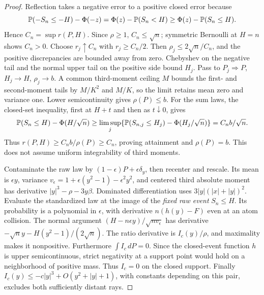 \begin{proof}
Reflection takes a negative error to a positive closed error because
\[
 \mathbb P(-S_n\le-H)-\Phi(-z)
 =\Phi(z)-\mathbb P(S_n<H)\ge\Phi(z)-\mathbb P(S_n\le H).
\]
Hence $C_n=\sup r(P,H)$. Since $\rho\ge1$, $C_n\le\sqrt n$;
symmetric Bernoulli at $H=n$ shows $C_n>0$.
Choose $r_j\uparrow C_n$ with $r_j\ge C_n/2$. Then
$\rho_j\le2\sqrt n/C_n$, and the positive discrepancies are bounded
away from zero. Chebyshev on the negative tail and the normal upper
tail on the positive side bound $H_j$. Pass to $P_j\Rightarrow P$,
$H_j\to H$, $\rho_j\to b$. A common third-moment ceiling $M$ bounds
the first- and second-moment tails by $M/K^2$ and $M/K$, so the limit
retains mean zero and variance one. Lower semicontinuity gives
$\rho(P)\le b$. For the sum laws, the closed-set inequality, first at
$H+t$ and then as $t\downarrow0$, gives
\[
 \mathbb P(S_n\le H)-\Phi(H/\sqrt n)
 \ge\limsup_j\{\mathbb P(S_{n,j}\le H_j)-\Phi(H_j/\sqrt n)\}
 =C_n b/\sqrt n.
\]
Thus $r(P,H)\ge C_n b/\rho(P)\ge C_n$, proving attainment and
$\rho(P)=b$. This does not assume uniform integrability of third moments.

Contaminate the raw law by $(1-\epsilon)P+\epsilon\delta_y$, then
recenter and rescale. Its mean is $\epsilon y$, variance
$v_\epsilon=1+\epsilon(y^2-1)-\epsilon^2y^2$, and centered third
absolute moment has derivative $|y|^3-\rho-3y\beta$.
Dominated differentiation uses $3|y|(|x|+|y|)^2$.
Evaluate the standardized law at the image of the \emph{fixed raw event}
$S_n\le H$. Its probability is a polynomial in $\epsilon$, with
derivative $n(h(y)-F)$ even at an atom collision. The normal argument
$(H-n\epsilon y)/\sqrt{nv_\epsilon}$ has derivative
$-\sqrt n y-H(y^2-1)/(2\sqrt n)$. The ratio derivative is
$I_c(y)/\rho$, and maximality makes it nonpositive.
Furthermore $\int I_c\,dP=0$. Since the closed-event function $h$ is
upper semicontinuous, strict negativity at a support point would hold
on a neighborhood of positive mass. Thus $I_c=0$ on the closed support.
Finally $I_c(y)\le-c|y|^3+O(y^2+|y|+1)$, with constants depending on
this pair, excludes both sufficiently distant rays.
\end{proof}

